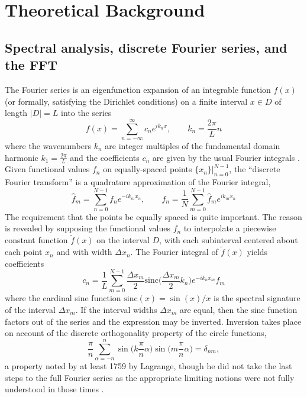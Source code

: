 \documentclass{article}
\begin{document}
\section{Theoretical Background}
\subsection{Spectral analysis, discrete Fourier series, and the FFT}
The Fourier series is an eigenfunction expansion of an integrable function $f(x)$ (or formally, satisfying the Dirichlet conditions) on a finite interval $x\in D$ of length $|D| = L$ into the series
\begin{equation}
    f(x) = \sum_{n=-\infty}^\infty c_ne^{ik_nx}, \quad\quad k_n = \frac{2\pi}{L}n
    \label{fseries}
\end{equation}
where the wavenumbers $k_n$ are integer multiples of the fundamental domain harmonic $k_1 = \frac{2\pi}{L}$ and the coefficients $c_n$ are given by the usual Fourier integrals \cite{lanczos2}. Given functional values $f_n$ on equally-spaced points $\{x_n\}|_{n=0}^{N-1}$, the ``discrete Fourier transform'' is a quadrature approximation of the Fourier integral,
\begin{equation}
  \hat{f}_m = \sum_{n=0}^{N-1}f_ne^{-ik_mx_n},\quad\quad f_n = \frac{1}{N}\sum_{m=0}^{N-1}\hat{f}_me^{ik_mx_n}\label{disc}
\end{equation}
The requirement that the points be equally spaced is quite important. The reason is revealed by supposing the functional values $f_n$ to interpolate a piecewise constant function $\widetilde{f}(x)$ on the interval $D$, with each subinterval centered about each point $x_n$ and with width $\Delta x_n$. The Fourier integral of $\widetilde{f}(x)$ yields coefficients
\begin{equation}
  c_n = \frac{1}{L}\sum_{m=0}^{N-1}\frac{\Delta x_m}{2} \text{sinc}\Big(\frac{\Delta x_m}{2}k_n\Big)e^{-ik_nx_m}f_m\label{sinc}
\end{equation}
where the cardinal sine function $\text{sinc}(x) = \sin(x)/x$ is the spectral signature of the interval $\Delta x_m$. If the interval widths $\Delta x_m$ are equal, then the sinc function factors out of the series and the expression may be inverted. Inversion takes place on account of the discrete orthogonality property of the circle functions,
\begin{equation}
  \frac{\pi}{n}\sum_{\alpha=-n}^n\sin\Big(k\frac{\pi}{n}\alpha\Big)\sin\Big(m\frac{\pi}{n}\alpha\Big) = \delta_{nm},
\end{equation}
a property noted by at least 1759 by Lagrange, though he did not take the last steps to the full Fourier series as the appropriate limiting notions were not fully understood in those times \cite{lanczos}.
\end{document}
